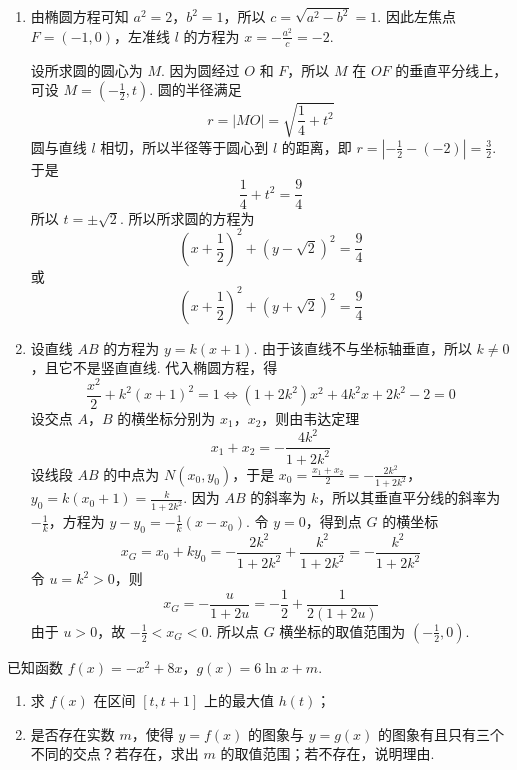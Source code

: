\begin{solution}
\begin{enumerate}
\item 由椭圆方程可知 \(a^{2}=2\)，\(b^{2}=1\)，所以 \(c=\sqrt{a^{2}-b^{2}}=1\). 因此左焦点 \(F=(-1,0)\)，左准线 \(l\) 的方程为 \(x=-\frac{a^{2}}{c}=-2\).

设所求圆的圆心为 \(M\). 因为圆经过 \(O\) 和 \(F\)，所以 \(M\) 在 \(OF\) 的垂直平分线上，可设 \(M=\left(-\frac{1}{2},t\right)\). 圆的半径满足
\[
r=|MO|=\sqrt{\frac{1}{4}+t^{2}}
\]
圆与直线 \(l\) 相切，所以半径等于圆心到 \(l\) 的距离，即 \(r=\left|-\frac{1}{2}-(-2)\right|=\frac{3}{2}\). 于是
\[
\frac{1}{4}+t^{2}=\frac{9}{4}
\]
所以 \(t=\pm\sqrt{2}\).
所以所求圆的方程为
\[
\left(x+\frac{1}{2}\right)^{2}+\left(y-\sqrt{2}\right)^{2}=\frac{9}{4}
\]
或
\[
\left(x+\frac{1}{2}\right)^{2}+\left(y+\sqrt{2}\right)^{2}=\frac{9}{4}
\]
\item 设直线 \(AB\) 的方程为 \(y=k(x+1)\). 由于该直线不与坐标轴垂直，所以 \(k\neq0\)，且它不是竖直直线. 代入椭圆方程，得
\[
\frac{x^{2}}{2}+k^{2}(x+1)^{2}=1
\Longleftrightarrow
(1+2k^{2})x^{2}+4k^{2}x+2k^{2}-2=0
\]
设交点 \(A\)，\(B\) 的横坐标分别为 \(x_{1}\)，\(x_{2}\)，则由韦达定理
\[
x_{1}+x_{2}=-\frac{4k^{2}}{1+2k^{2}}
\]
设线段 \(AB\) 的中点为 \(N(x_{0},y_{0})\)，于是 \(x_{0}=\frac{x_{1}+x_{2}}{2}=-\frac{2k^{2}}{1+2k^{2}}\)，\(y_{0}=k(x_{0}+1)=\frac{k}{1+2k^{2}}\).
因为 \(AB\) 的斜率为 \(k\)，所以其垂直平分线的斜率为 \(-\frac{1}{k}\)，方程为 \(y-y_{0}=-\frac{1}{k}(x-x_{0})\). 令 \(y=0\)，得到点 \(G\) 的横坐标
\[
x_G=x_{0}+ky_{0}=-\frac{2k^{2}}{1+2k^{2}}+\frac{k^{2}}{1+2k^{2}}=-\frac{k^{2}}{1+2k^{2}}
\]
令 \(u=k^{2}>0\)，则
\[
x_G=-\frac{u}{1+2u}=-\frac{1}{2}+\frac{1}{2(1+2u)}
\]
由于 \(u>0\)，故 \(-\frac{1}{2}<x_G<0\). 所以点 \(G\) 横坐标的取值范围为 \(\left(-\frac{1}{2},0\right)\).
\end{enumerate}
\end{solution}

\begin{problem}
已知函数 \( f(x) = -x^2 + 8x \)，\( g(x) = 6\ln x + m \).

\begin{enumerate}
\item 求 \( f(x) \) 在区间 \( \left[t, t + 1\right] \) 上的最大值 \( h(t) \)；
\item 是否存在实数 \(m\)，使得 \(y = f(x)\) 的图象与 \(y = g(x)\) 的图象有且只有三个不同的交点？若存在，求出 \(m\) 的取值范围；若不存在，说明理由.
\end{enumerate}
\end{problem}

